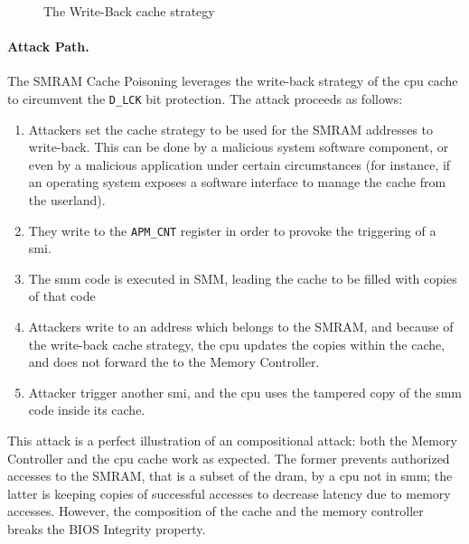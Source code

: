 \begin{figure}

  \caption{The Write-Back cache strategy}
  \label{fig:usecase:writeback}
\end{figure}

\paragraph{Attack Path.}
%
The SMRAM Cache Poisoning leverages the write-back strategy of the \ac{cpu}
cache to circumvent the \texttt{D\_LCK} bit protection.
%
The attack proceeds as follows:

\begin{enumerate}
\item Attackers set the cache strategy to be used for the SMRAM addresses to
  write-back.
  This can be done by a malicious system software component, or even by a
  malicious application under certain circumstances (for instance, if an
  operating system exposes a software interface to manage the cache from the
  userland).

%
\item They write to the \texttt{APM\_CNT} register in order to provoke the
  triggering of a \ac{smi}.
%
\item The \ac{smm}  code is executed in SMM, leading the cache to be filled with
  copies of that code
%
\item {}Attackers write to an address which belongs to the SMRAM, and because of
  the write-back cache strategy, the \ac{cpu} updates the copies within the
  cache, and does not forward the \IO to the Memory Controller.
%
\item Attacker trigger another \ac{smi}, and the \ac{cpu} uses the tampered copy
  of the \ac{smm} code inside its cache.
\end{enumerate}
%
This attack is a perfect illustration of an compositional attack:
%
both the Memory Controller and the \ac{cpu} cache work as expected.
%
The former prevents authorized accesses to the SMRAM, that is a subset of the
\ac{dram}, by a \ac{cpu} not in \ac{smm};
%
the latter is keeping copies of successful accesses to decrease latency due to
memory accesses.
%
However, the composition of the cache and the memory controller breaks the BIOS
Integrity property.

